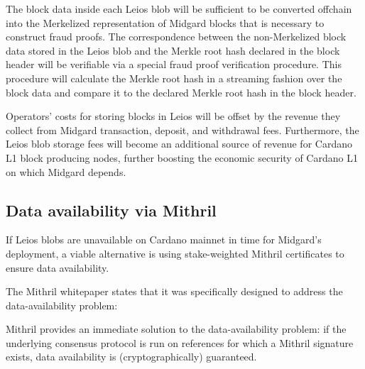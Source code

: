 \documentclass[../midgard.tex]{subfiles}
\begin{document}
The block data inside each Leios blob will be sufficient to be converted offchain into the Merkelized representation of Midgard blocks that is necessary to construct fraud proofs.
The correspondence between the non-Merkelized block data stored in the Leios blob and the Merkle root hash declared in the block header will be verifiable via a special fraud proof verification procedure.
This procedure will calculate the Merkle root hash in a streaming fashion over the block data and compare it to the declared Merkle root hash in the block header.


Operators' costs for storing blocks in Leios will be offset by the revenue they collect from Midgard transaction, deposit, and withdrawal fees.
Furthermore, the Leios blob storage fees will become an additional source of revenue for Cardano L1 block producing nodes, further boosting the economic security of Cardano L1 on which Midgard depends.

\subsection{Data availability via Mithril}
\label{h:data-availability-multisig}

If Leios blobs are unavailable on Cardano mainnet in time for Midgard's deployment, a viable alternative is using stake-weighted Mithril certificates to ensure data availability.

The Mithril whitepaper states that it was specifically designed to address the data-availability problem:
\begin{quotePretty}
Mithril provides an immediate solution to the data-availability problem: if the underlying consensus protocol is run on references for which a Mithril signature exists, data availability is (cryptographically) guaranteed.
\end{quotePretty}
\end{document}
